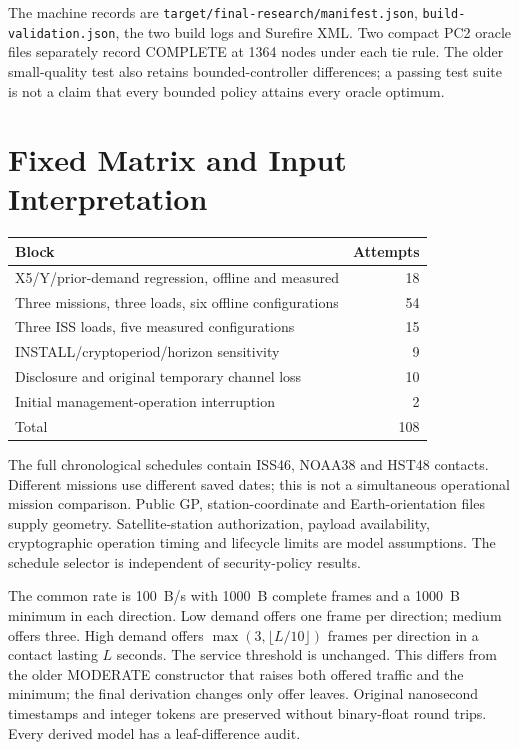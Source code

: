 \documentclass[11pt]{article}
\begin{document}
The machine records are \texttt{target/final-research/manifest.json},
\texttt{build-validation.json}, the two build logs and Surefire XML. Two compact PC2 oracle
files separately record COMPLETE at 1364 nodes under each tie rule. The older small-quality
test also retains bounded-controller differences; a passing test suite is not a claim that
every bounded policy attains every oracle optimum.

\section{Fixed Matrix and Input Interpretation}
\begin{center}
\begin{tabular}{lr}\toprule Block & Attempts \\
\midrule
X5/Y/prior-demand regression, offline and measured & 18 \\
Three missions, three loads, six offline configurations & 54 \\
Three ISS loads, five measured configurations & 15 \\
INSTALL/cryptoperiod/horizon sensitivity & 9 \\
Disclosure and original temporary channel loss & 10 \\
Initial management-operation interruption & 2 \\
\midrule Total & 108 \\
\bottomrule\end{tabular}
\end{center}

The full chronological schedules contain ISS46, NOAA38 and HST48 contacts. Different missions
use different saved dates; this is not a simultaneous operational mission comparison. Public
GP, station-coordinate and Earth-orientation files supply geometry. Satellite-station
authorization, payload availability, cryptographic operation timing and lifecycle limits are
model assumptions. The schedule selector is independent of security-policy results.

The common rate is 100~B/s with 1000~B complete frames and a 1000~B minimum in each direction.
Low demand offers one frame per direction; medium offers three. High demand offers
$\max(3,\lfloor L/10\rfloor)$ frames per direction in a contact lasting $L$ seconds.
The service threshold is unchanged. This differs from the older MODERATE constructor that
raises both offered traffic and the minimum; the final derivation changes only offer leaves.
Original nanosecond timestamps and integer tokens are preserved without binary-float
round trips. Every derived model has a leaf-difference audit.
\end{document}
